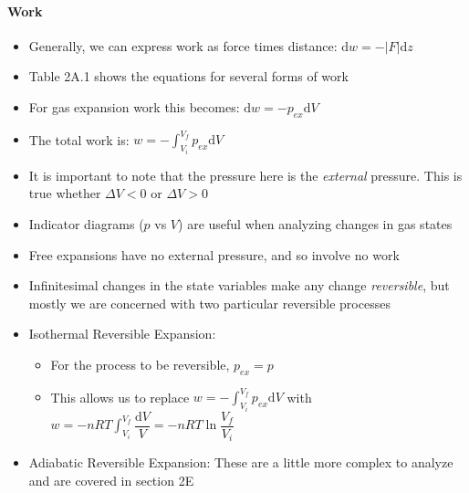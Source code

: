 \documentclass[12pt, openany, letterpaper]{memoir}
\begin{document}
\paragraph{Work}
\begin{itemize}
	\item Generally, we can express work as force times distance: $\mathrm{d}w = -\left|F\right|\mathrm{d}z$
	\item Table 2A.1 shows the equations for several forms of work
	\item For gas expansion work this becomes: $\mathrm{d}w = -p_{ex}\mathrm{d}V$
	\item The total work is: $w=-\displaystyle\int_{V_i}^{V_f}p_{ex}\mathrm{d}V$
	\item It is important to note that the pressure here is the \emph{external} pressure. This is true whether $\Delta V<0$ or $\Delta V>0$
	\item Indicator diagrams ($p$ vs $V$) are useful when analyzing changes in gas states
	\item Free expansions have no external pressure, and so involve no work
	\item Infinitesimal changes in the state variables make any change \emph{reversible}, but mostly we are concerned with two particular reversible processes
	\item Isothermal Reversible Expansion:
	      \begin{itemize}
		      \item For the process to be reversible, $p_{ex}=p$
		      \item This allows us to replace $w=-\displaystyle\int_{V_i}^{V_f}\!p_{ex}\mathrm{d}V$ with $w=-nRT\displaystyle\int_{V_i}^{V_f}\dfrac{\mathrm{d}V}{V} = -nRT\ln\dfrac{V_f}{V_i}$
	      \end{itemize}
	\item Adiabatic Reversible Expansion: These are a little more complex to analyze and are covered in section 2E
\end{itemize}
\end{document}
